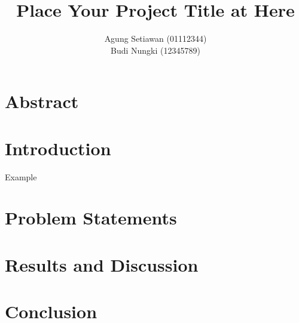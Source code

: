 \documentclass[12pt]{article}
\title{Place Your Project Title at Here}
\author{\textup{Agung Setiawan (01112344)}\\
        \textup{Budi Nungki (12345789)}\\}
\begin{document}
    
    \tableofcontents
    \newpage

    \section{Abstract}

    \section{Introduction}
     Example \cite{farokhzad2009impact}

     
    \section{Problem Statements}

    \section{Results and Discussion}
    
    \section{Conclusion}

    
    
\end{document}
